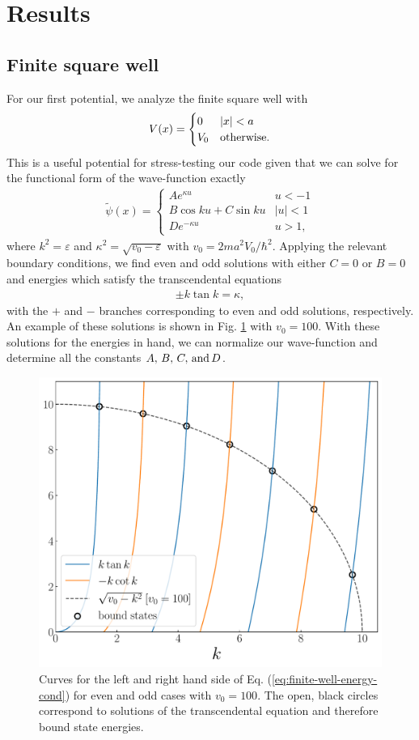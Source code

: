 \section{Results}
\label{sec:results}

\subsection{Finite square well}
\label{ssec:finite-square-well}

For our first potential, we analyze the finite square well with
\begin{align}
    V(x) = \begin{cases}
        0 & |x| < a \\
        V_0 & {\rm otherwise}
    .\end{cases}
\end{align}
This is a useful potential for stress-testing our code given that we can solve for the functional form of the wave-function exactly
\begin{align}
    \tilde{\psi}(x) = \begin{cases}
        A e^{\kappa u} & u < -1 \\
        B \cos{k u} + C \sin{k u} & |u| < 1 \\
        D e^{-\kappa u} & u > 1
    ,\end{cases}
\end{align}
where $k^2 = \varepsilon$ and $\kappa^2 = \sqrt{v_0 - \varepsilon}$ with $v_0 = 2 m a^2 V_0 / \hbar^2$.
Applying the relevant boundary conditions, we find even and odd solutions with either $C = 0$ or $B = 0$ and energies which satisfy the transcendental equations
\begin{align}
\label{eq:finite-well-energy-cond}
    \pm k \tan{k} = \kappa
,\end{align}
with the $+$ and $-$ branches corresponding to even and odd solutions, respectively.
An example of these solutions is shown in Fig. \ref{fig:finite-well-exact-solutions} with $v_0 = 100$.
With these solutions for the energies in hand, we can normalize our wave-function and determine all the constants $A,\,B,\,C,\,{\rm and}\,D$.

\begin{figure}[h!tb]
    \centering
    \includegraphics[width=0.5\linewidth]{finite_well_exact_solutions.pdf}
    \caption{Curves for the left and right hand side of Eq. (\ref{eq:finite-well-energy-cond}) for even and odd cases with $v_0 = 100$. The open, black circles correspond to solutions of the transcendental equation and therefore bound state energies.}
    \label{fig:finite-well-exact-solutions}
\end{figure}

